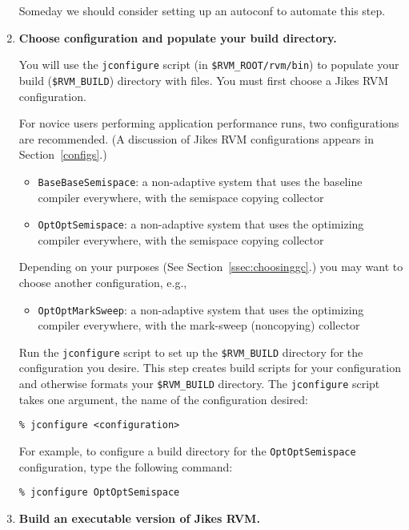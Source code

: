 \begin{enumerate}
Someday we should consider setting up an autoconf to automate this
step.

\item {\bf Choose configuration and populate your build directory.}

You will use the {\tt jconfigure} script (in {\tt \$RVM\_ROOT/rvm/bin}) to
populate your build ({\tt \$RVM\_BUILD}) directory with files.  You must
first choose a Jikes RVM configuration.

For novice users performing application performance runs, two
configurations are recommended.  (A discussion 
of Jikes RVM configurations appears in Section~\ref{configs}.)

\begin{itemize}
\item {\tt BaseBaseSemispace}: a non-adaptive system that uses the
baseline compiler everywhere, with the semispace copying collector
\item {\tt OptOptSemispace}: a non-adaptive system that uses the
optimizing compiler everywhere, with the semispace copying collector
\end{itemize}

Depending on your purposes (See Section~\ref{ssec:choosinggc}.) you
may want to choose another configuration, e.g.,
\begin{itemize}
\item {\tt OptOptMarkSweep}: a non-adaptive system that uses the
optimizing  compiler everywhere, with the mark-sweep (noncopying) collector
\end{itemize}

Run the {\tt jconfigure} script to set up the {\tt \$RVM\_BUILD}
directory for the configuration you desire.  This step creates
build scripts for your configuration and otherwise formats your
{\tt \$RVM\_BUILD} directory.
The {\tt jconfigure} script takes one argument, the name of the
configuration desired: 

\begin{verbatim}
% jconfigure <configuration>
\end{verbatim}

For example, to configure a build 
directory for the {\tt OptOptSemispace} configuration, type
the following command:

\begin{verbatim}
% jconfigure OptOptSemispace
\end{verbatim}

\item {\bf Build an executable version of Jikes RVM.}  


\end{enumerate}
